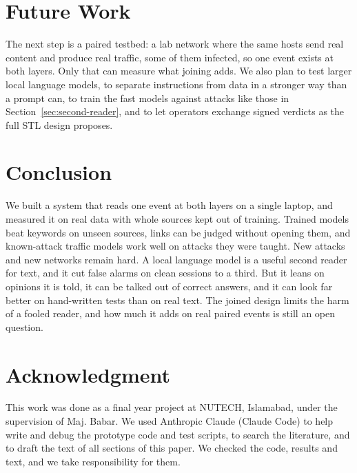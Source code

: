\section{Future Work}

The next step is a paired testbed: a lab network where the same hosts send real content and produce real traffic, some of them infected, so one event exists at both layers. Only that can measure what joining adds. We also plan to test larger local language models, to separate instructions from data in a stronger way than a prompt can, to train the fast models against attacks like those in Section~\ref{sec:second-reader}, and to let operators exchange signed verdicts as the full STL design proposes.

\section{Conclusion}

We built a system that reads one event at both layers on a single laptop, and measured it on real data with whole sources kept out of training. Trained models beat keywords on unseen sources, links can be judged without opening them, and known-attack traffic models work well on attacks they were taught. New attacks and new networks remain hard. A local language model is a useful second reader for text, and it cut false alarms on clean sessions to a third. But it leans on opinions it is told, it can be talked out of correct answers, and it can look far better on hand-written tests than on real text. The joined design limits the harm of a fooled reader, and how much it adds on real paired events is still an open question.

\section*{Acknowledgment}

This work was done as a final year project at NUTECH, Islamabad, under the supervision of Maj. Babar. We used Anthropic Claude (Claude Code) to help write and debug the prototype code and test scripts, to search the literature, and to draft the text of all sections of this paper. We checked the code, results and text, and we take responsibility for them.
